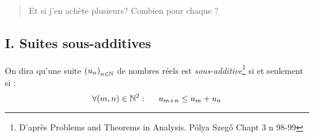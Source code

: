 \begin{quote}
\og Et si j'en achète plusieurs? Combien pour chaque ? \fg
\end{quote} 

\subsection*{I. Suites sous-additives}
On dira qu'une suite $\left( u_n\right) _{n\in \mathbb{N}}$ de nombres réels est \emph{sous-additive}\footnote{D'après Problems and Theorems in Analysis. P\'olya Szeg\H{o} Chapt 3 n 98-99} si et seulement si :
\begin{displaymath}
 \forall(m,n)\in \mathbb{N}^2:\hspace{0.5cm}u_{m+n} \leq u_m + u_n
\end{displaymath}
